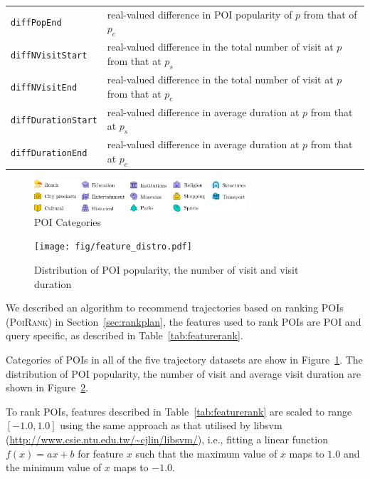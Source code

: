\begin{table}[t]
\begin{tabular}{l|l}
\texttt{diffPopEnd}             & real-valued difference in POI popularity of $p$ from that of $p_e$ \\
\texttt{diffNVisitStart}        & real-valued difference in the total number of visit at $p$ from that at $p_s$ \\
\texttt{diffNVisitEnd}          & real-valued difference in the total number of visit at $p$ from that at $p_e$ \\
\texttt{diffDurationStart}      & real-valued difference in average duration at $p$ from that at $p_s$ \\
\texttt{diffDurationEnd}        & real-valued difference in average duration at $p$ from that at $p_e$ \\ \hline
\end{tabular}
\end{table}


\begin{figure}[t]
	\centering
	\includegraphics[width=0.7\textwidth]{fig/poi_cats_fat.pdf}
	\caption{POI Categories}
	\label{fig:poicats}
\end{figure}


\begin{figure}[t]
\texttt{[image: fig/feature\_distro.pdf]}
\caption{Distribution of POI popularity, the number of visit and visit duration}
\label{fig:distro}\captionmoveup
\end{figure}



We described an algorithm to recommend trajectories based on ranking POIs (\textsc{PoiRank}) in Section~\ref{sec:rankplan},
the features used to rank POIs are POI and query specific, as described in Table~\ref{tab:featurerank}.

Categories of POIs in all of the five trajectory datasets are show in Figure~\ref{fig:poicats}.
The distribution of POI popularity, the number of visit and average visit duration are shown in Figure~\ref{fig:distro}.

To rank POIs, features described in Table~\ref{tab:featurerank} are scaled to range $[-1.0, 1.0]$ using the same approach 
as that utilised by libsvm (\url{http://www.csie.ntu.edu.tw/~cjlin/libsvm/}),
i.e., fitting a linear function $f(x) = a x + b$ for feature $x$ such that the maximum value of $x$ maps to $1.0$ 
and the minimum value of $x$ maps to $-1.0$.



